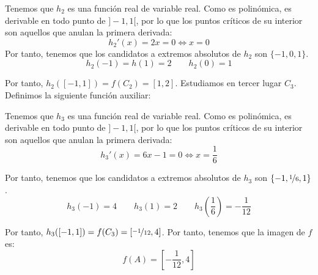 \begin{ejercicio}
    Tenemos que $h_2$ es una función real de variable real. Como es polinómica, es derivable en todo punto de $]-1,1[$, por lo que los puntos críticos de su interior son aquellos que anulan la primera derivada:
    \begin{equation*}
        h_2'(x) = 2x = 0 \Longleftrightarrow x=0
    \end{equation*}
    Por tanto, tenemos que los candidatos a extremos absolutos de $h_2$ son $\{-1,0,1\}$.
    \begin{equation*}
        h_2(-1)=h(1)=2 \qquad h_2(0) = 1
    \end{equation*}

    Por tanto, $h_2([-1,1])=f(C_2) = [1,2]$. Estudiamos en tercer lugar $C_3$. Definimos la siguiente función auxiliar:

    Tenemos que $h_3$ es una función real de variable real. Como es polinómica, es derivable en todo punto de $]-1,1[$, por lo que los puntos críticos de su interior son aquellos que anulan la primera derivada:
    \begin{equation*}
        h_3'(x) = 6x -1 = 0 \Longleftrightarrow x=\frac{1}{6}
    \end{equation*}

    Por tanto, tenemos que los candidatos a extremos absolutos de $h_3$ son $\{-1,\nicefrac{1}{6},1\}$.
    \begin{equation*}
        h_3(-1)=4 \qquad h_3(1)=2 \qquad h_3\left(\frac{1}{6}\right) = -\frac{1}{12}
    \end{equation*}

    Por tanto, $h_3([-1,1])=f(C_3) = \left[\nicefrac{-1}{12}, 4\right]$. Por tanto, tenemos que la imagen de $f$ es:
    \begin{equation*}
        f(A) = \left[-\frac{1}{12},4\right]
    \end{equation*}
\end{ejercicio}


